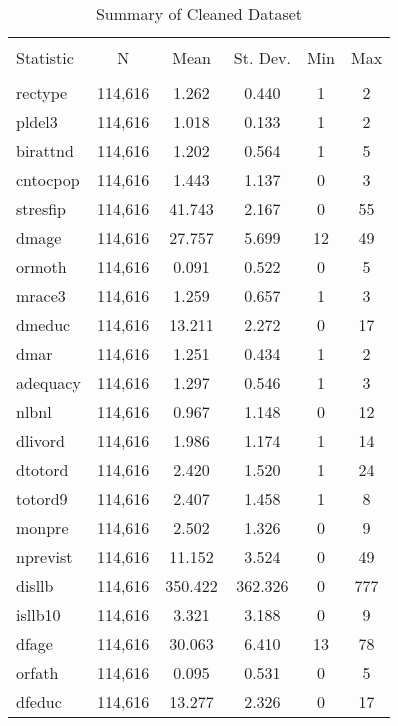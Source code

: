 \documentclass{article}
\begin{document}
\begin{table}[!htbp] \centering 
  \caption{Summary of Cleaned Dataset} 
  \label{} 
\begin{tabular}{@{\extracolsep{5pt}}lccccc} 
\\[-1.8ex]\hline 
\hline \\[-1.8ex] 
Statistic & \multicolumn{1}{c}{N} & \multicolumn{1}{c}{Mean} & \multicolumn{1}{c}{St. Dev.} & \multicolumn{1}{c}{Min} & \multicolumn{1}{c}{Max} \\ 
\hline \\[-1.8ex] 
rectype & 114,616 & 1.262 & 0.440 & 1 & 2 \\ 
pldel3 & 114,616 & 1.018 & 0.133 & 1 & 2 \\ 
birattnd & 114,616 & 1.202 & 0.564 & 1 & 5 \\ 
cntocpop & 114,616 & 1.443 & 1.137 & 0 & 3 \\ 
stresfip & 114,616 & 41.743 & 2.167 & 0 & 55 \\ 
dmage & 114,616 & 27.757 & 5.699 & 12 & 49 \\ 
ormoth & 114,616 & 0.091 & 0.522 & 0 & 5 \\ 
mrace3 & 114,616 & 1.259 & 0.657 & 1 & 3 \\ 
dmeduc & 114,616 & 13.211 & 2.272 & 0 & 17 \\ 
dmar & 114,616 & 1.251 & 0.434 & 1 & 2 \\ 
adequacy & 114,616 & 1.297 & 0.546 & 1 & 3 \\ 
nlbnl & 114,616 & 0.967 & 1.148 & 0 & 12 \\ 
dlivord & 114,616 & 1.986 & 1.174 & 1 & 14 \\ 
dtotord & 114,616 & 2.420 & 1.520 & 1 & 24 \\ 
totord9 & 114,616 & 2.407 & 1.458 & 1 & 8 \\ 
monpre & 114,616 & 2.502 & 1.326 & 0 & 9 \\ 
nprevist & 114,616 & 11.152 & 3.524 & 0 & 49 \\ 
disllb & 114,616 & 350.422 & 362.326 & 0 & 777 \\ 
isllb10 & 114,616 & 3.321 & 3.188 & 0 & 9 \\ 
dfage & 114,616 & 30.063 & 6.410 & 13 & 78 \\ 
orfath & 114,616 & 0.095 & 0.531 & 0 & 5 \\ 
dfeduc & 114,616 & 13.277 & 2.326 & 0 & 17 \\ 

\end{tabular}
\end{table}
\end{document}
